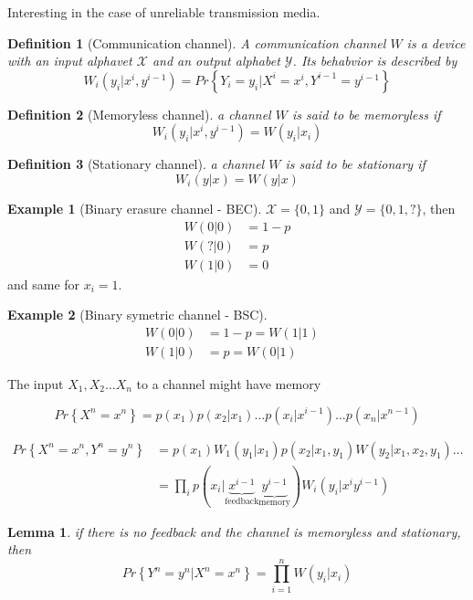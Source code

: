 \documentclass{article}
\newtheorem{lemma}[theorem]{Lemma}
\newtheorem{definition}{Definition}[section]
\theoremstyle{definition} %
\newtheorem{example}{Example}
\renewcommand{\Pr}[1]{Pr\left\{#1\right\}}
\def\X{\mathcal{X}}
\def\Y{\mathcal{Y}}
\begin{document}
Interesting in the case of unreliable transmission media.

\begin{definition}[Communication channel]
  A communication channel $W$ is a device with an input alphavet $\X$ and an output
  alphabet $\Y$. Its behabvior is described by
  \[
    W_i(y_i | x^i, y^{i-1}) = \Pr{Y_i = y_i | X^i = x^i, Y^{i-1} = y^{i-1}}
  \]
\end{definition}

\begin{definition}[Memoryless channel]
  a channel $W$ is said to be memoryless if
  \[
      W_i(y_i | x^i, y^{i-1}) = W(y_i|x_i)
    \]
\end{definition}

\begin{definition}[Stationary channel]
  a channel $W$ is said to be stationary if
  \[
      W_i(y|x) = W(y|x)
    \]
\end{definition}

\begin{example}[Binary erasure channel - BEC]
  $\X = \{0,1\}$ and $\Y = \{0,1,?\}$, then
  \begin{align*}
    W(0|0) &= 1 - p\\
    W(?|0) &= p\\
    W(1|0) &= 0
  \end{align*}
  and same for $x_i=1$.
\end{example}

\begin{example}[Binary symetric channel - BSC]
  \begin{align*}
    W(0|0) &= 1 - p = W(1|1)&\\
    W(1|0) &= p =W(0|1)
  \end{align*}
\end{example}

The input $X_1, X_2 \dots X_n$ to a channel might have memory

\[
  \Pr{X^n = x^n} = p(x_1)p(x_2 | x_1) \dots p(x_i | x^{i-1}) \dots p(x_n|x^{n-1})
\]

\begin{align*}
  \Pr{X^n=x^n, Y^n=y^n} &= p(x_1)W_1(y_1|x_1)p(x_2|x_1,y_1)W(y_2|x_1,x_2,y_1)\dots\\
  &= \prod_i p(x_i|
  \underbrace{x^{i-1}}_{\text{feedback}}
  \underbrace{y^{i-1}}_{\text{memory}}
  )W_i(y_i|x^iy^{i-1})
\end{align*}

\begin{lemma}
  if there is no feedback and the channel is memoryless and stationary, then
  \[
    \Pr{Y^n=y^n | X^n=x^n} = \prod_{i=1}^n W(y_i|x_i)
  \]
\end{lemma}
\end{document}
